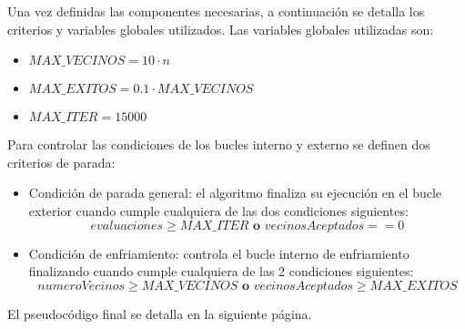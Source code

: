 Una vez definidas las componentes necesarias, a continuación se detalla los criterios y variables globales utilizados. 
Las variables globales utilizadas son:
\begin{itemize}
	\item $MAX\_VECINOS = 10 \cdot n$
	\item $MAX\_EXITOS = 0.1\cdot MAX\_VECINOS$
	\item $MAX\_ITER = 15000$
\end{itemize}
Para controlar las condiciones de los bucles interno y externo se definen dos criterios de parada:

\begin{itemize}
	
	\item Condición de parada general: el algoritmo finaliza su ejecución en el bucle exterior cuando cumple cualquiera de las dos condiciones siguientes:
	$$ evaluaciones \geq MAX\_ITER \textbf{ o } vecinosAceptados == 0 $$
	
	\item Condición de enfriamiento: controla el bucle interno de enfriamiento finalizando cuando cumple cualquiera de las 2 condiciones siguientes:
	$$ numeroVecinos \geq MAX\_VECINOS \textbf{ o } vecinosAceptados \geq MAX\_EXITOS $$
\end{itemize}

El pseudocódigo final se detalla en la siguiente página.

\newpage

